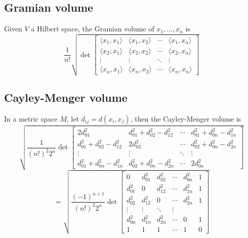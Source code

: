 \documentclass{treatise}
\begin{document}
\begin{shaded}
\subsection{Gramian volume}
Given $V$ a Hilbert space, the Gramian volume of $x_1, \hdots, x_n$ is
$$\frac{1}{n!} \sqrt{\det \begin{bmatrix}
\langle x_1, x_1 \rangle & \langle x_1, x_2 \rangle & \cdots & \langle x_1, x_n \rangle \\
\langle x_2, x_1 \rangle & \langle x_2, x_2 \rangle & \cdots & \langle x_2, x_n \rangle \\
\vdots & \vdots & \ddots & \vdots \\
\langle x_n, x_1 \rangle & \langle x_n, x_2 \rangle & \cdots & \langle x_n, x_n \rangle
\end{bmatrix}}$$

\subsection{Cayley-Menger volume}
In a metric space $M$, let $d_{ij} = d(x_i, x_j)$, then the Cayley-Menger volume is
$$\sqrt{\frac{1}{(n!)^2 2^n} \det \begin{bmatrix}
2 d_{01}^2 & d_{01}^2 + d_{02}^2 - d_{12}^2 & \cdots & d_{01}^2 + d_{0n}^2 - d_{1n}^2 \\
d_{01}^2 + d_{02}^2 - d_{12}^2 & 2 d_{02}^2 & \cdots & d_{02}^2 + d_{0n}^2 - d_{2n}^2 \\
\vdots & \vdots & \ddots & \vdots \\
d_{01}^2 + d_{0n}^2 - d_{1n}^2 & d_{02}^2 + d_{0n}^2 - d_{2n}^2 & \cdots &  2 d_{0n}^2
\end{bmatrix}}$$
$$= \sqrt{\frac{(-1)^{n + 1}}{(n!)^2 2^n} \det \begin{bmatrix}
0 & d_{01}^2 & d_{02}^2 & \cdots & d_{0n}^2 & 1 \\
d_{01}^2 & 0 & d_{12}^2 & \cdots & d_{1n}^2 & 1 \\
d_{02}^2 & d_{12}^2 & 0 & \cdots & d_{2n}^2 & 1 \\
\vdots & \vdots & \ddots & \vdots \\
d_{0n}^2 & d_{1n}^2 & d_{2n}^2 & \cdots & 0 & 1 \\
1 & 1 & 1 & \cdots & 1 & 0
\end{bmatrix}}$$
\end{shaded}
\end{document}
